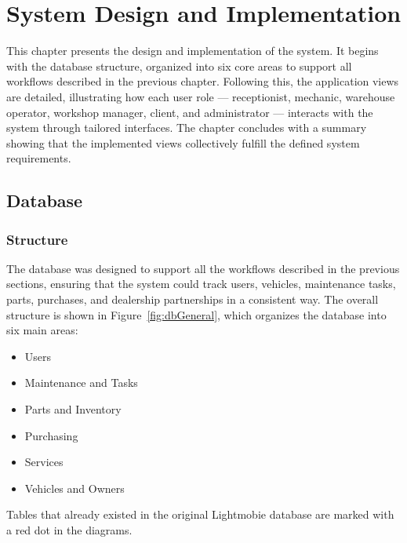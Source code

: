 \chapter{System Design and Implementation}%
\label{chapter:systemDesignandImplementation}

\begin{introduction}
This chapter presents the design and implementation of the system. It begins with the database structure, organized into six core areas to support all workflows described in the previous chapter. Following this, the application views are detailed, illustrating how each user role — receptionist, mechanic, warehouse operator, workshop manager, client, and administrator — interacts with the system through tailored interfaces. The chapter concludes with a summary showing that the implemented views collectively fulfill the defined system requirements.
\end{introduction} 


\section{Database}


\subsection{Structure} 



The database was designed to support all the workflows described in the previous sections, ensuring that the system could track users, vehicles, maintenance tasks, parts, purchases, and dealership partnerships in a consistent way. The overall structure is shown in Figure~\ref{fig:dbGeneral}, which organizes the database into six main areas:
 
\begin{itemize}
  \item Users
  \item Maintenance and Tasks
  \item Parts and Inventory 
  \item Purchasing
  \item Services
  \item Vehicles and Owners
\end{itemize}

Tables that already existed in the original Lightmobie database are marked with a red dot in the diagrams.

